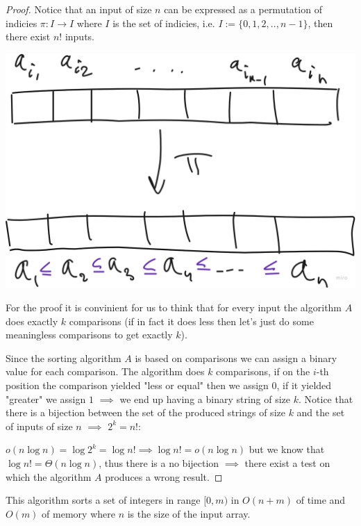 \begin{proof}

    Notice that an input of size $n$ can be expressed as a permutation of indicies $\pi: I \to I$ where $I$ is the set of indicies, i.e. $I:=\{0, 1, 2, .., n-1\}$, then there exist $n!$ inputs.

    \begin{center}
        \includegraphics[scale=0.18]{./assets/13-sorting-algorithms/3.png}
    \end{center}

    For the proof it is convinient for us to think that for every input the algorithm $A$ does exactly $k$ comparisons (if in fact it does less then let's just do some meaningless comparisons to get exactly $k$).

    Since the sorting algorithm $A$ is based on comparisons we can assign a binary value for each comparison. The algorithm does $k$ comparisons, if on the $i$-th position the comparison yielded "less or equal" then we assign $0$, if it yielded "greater" we assign $1$ $\implies$ we end up having a binary string of size $k$. Notice that there is a bijection between the set of the produced strings of size $k$ and the set of inputs of size $n$ $\implies$ $2^k = n!$:

    $o(n \log{n}) = \log{2^k} = \log{n!} \implies \log{n!} = o(n \log{n})$ but we know that $\log{n!} = \Theta(n \log{n})$, thus there is a no bijection $\implies$ there exist a test on which the algorithm $A$ produces a wrong result.

\end{proof}



This algorithm sorts a set of integers in range $[0, m)$ in $O(n + m)$ of time and $O(m)$ of memory where $n$ is the size of the input array.

